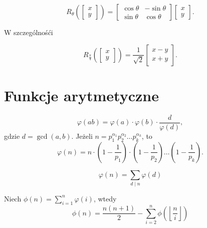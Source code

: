 \[ 
R_{\theta}\left( \begin{bmatrix} x \\ y \end{bmatrix}\right) = 
	\begin{bmatrix} \cos \theta & -\sin \theta \\ 
	\sin \theta & \cos \theta \end{bmatrix} \begin{bmatrix}
		x \\ y
	\end{bmatrix}.
\]

W szczególnośći 

\[
R_{\frac{\pi}{4}}\left( \begin{bmatrix} x \\ y \end{bmatrix}\right) = 
	\frac{1}{\sqrt{2}}
	\begin{bmatrix}
		x - y \\
		x + y
	\end{bmatrix}.
\]



\section{Funkcje arytmetyczne}
\[\varphi(ab) = \varphi(a) \cdot \varphi(b) \cdot \frac{d}{\varphi(d)},\]
gdzie $d = \gcd(a, b)$.
Jeżeli $n = p_1^{\alpha_1} p_2^{\alpha_2} \dots p_k^{\alpha_k}$, to
\[\varphi(n) = n \cdot \left( 1 - \frac{1}{p_1}\right) \cdot \left( 1 - \frac{1}{p_2}\right) \dots \left( 1 - \frac{1}{p_k}\right).\]

\[ \varphi(n) = \sum_{d \mid n} \varphi(d)\]

Niech $\phi(n) = \sum_{i=1}^n \varphi(i)$, wtedy
\[ \phi(n) = \frac{n(n+1)}{2} - \sum_{i=2}^n \phi \left( \left\lfloor \frac{n}{i}\right \rfloor \right)\]


